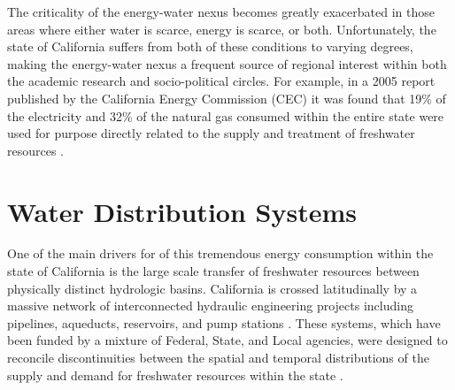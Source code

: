 The criticality of the energy-water nexus becomes greatly exacerbated in those areas where either water is scarce, energy is scarce, or both. Unfortunately, the state of California suffers from both of these conditions to varying degrees, making the energy-water nexus a frequent source of regional interest within both the academic research and socio-political circles. For example, in a 2005 report published by the California Energy Commission (CEC) it was found that 19\% of the electricity and 32\% of the natural gas consumed within the entire state were used for purpose directly related to the supply and treatment of freshwater resources \cite{Horvath2005}.
    
\section{Water Distribution Systems}
    
One of the main drivers for of this tremendous energy consumption within the state of California is the large scale transfer of freshwater resources between physically distinct hydrologic basins. California is crossed latitudinally by a massive network of interconnected hydraulic engineering projects including pipelines, aqueducts, reservoirs, and pump stations \cite{Schwarzenegger2005}. These systems, which have been funded by a mixture of Federal, State, and Local agencies, were designed to reconcile discontinuities between the spatial and temporal distributions of the supply and demand for freshwater resources within the state \cite{Freeman2008}.

